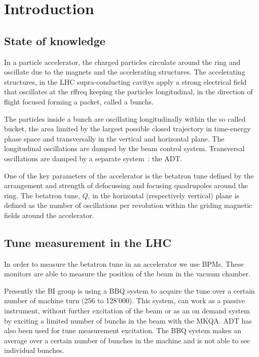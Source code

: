 %

\chapter{Introduction}

\section{State of knowledge}

In a particle accelerator, the charged particles circulate around the ring and oscillate due to the magnets and the accelerating structures. The accelerating structures, in the \gls{LHC} supra-conducting \glspl{cavity} apply a strong electrical field that oscillates at the \gls{rffreq} keeping the particles longitudinal, in the direction of flight focused forming a packet, called a \glspl{bunch}.

The particles inside a bunch are oscillating longitudinally within the so called bucket, the area limited by the largest possible closed trajectory in time-energy phase space and transversally in the vertical and horizontal plane. The longitudinal oscillations are damped by the beam control system. Transversal oscillations are damped by a separate system~: the \gls{ADT}\cite{Zhabitsky:1141925,Benews11}.

One of the key parameters of the accelerator is the betatron tune defined by the arrangement and strength of defocussing and focusing quadrupoles around the ring. The betatron tune, $Q$, in the horizontal (respectively vertical) plane is defined as the number of oscillations per revolution within the griding magnetic fields around the accelerator.

\section{Tune measurement in the LHC}

In order to measure the betatron tune in an accelerator we use \glspl{BPM}. These monitors are able to measure the position of the beam in the vacuum chamber.

Presently the \gls{BI} group is using a \gls{BBQ} \cite{Boccardi:1156349} system to acquire the tune over a certain number of machine turn (256 to 128'000). This system, can work as a passive instrument, without further excitation of the beam or as an on demand system by exciting a limited number of \glspl{bunch} in the beam with the \gls{MKQA}. \Gls{ADT} has also been used for tune measurement excitation\cite{HofleEvian10}. The \gls{BBQ} system makes an average over a certain number of bunches in the machine and is not able to see individual bunches.


